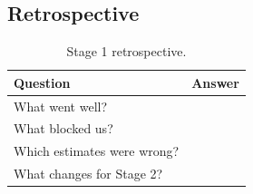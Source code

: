 \subsection{Retrospective}
\begin{table}[H]
  \centering
  \caption{Stage 1 retrospective.}
  \label{tab:stage1retro}
  \begin{tabularx}{\textwidth}{@{}P{4.5cm} Y@{}}
    \toprule
    \textbf{Question} & \textbf{Answer}\\
    \midrule
    What went well?                     & \\
    What blocked us?                    & \\
    Which estimates were wrong?         & \\
    What changes for Stage 2?           & \\
    \bottomrule
  \end{tabularx}
\end{table}